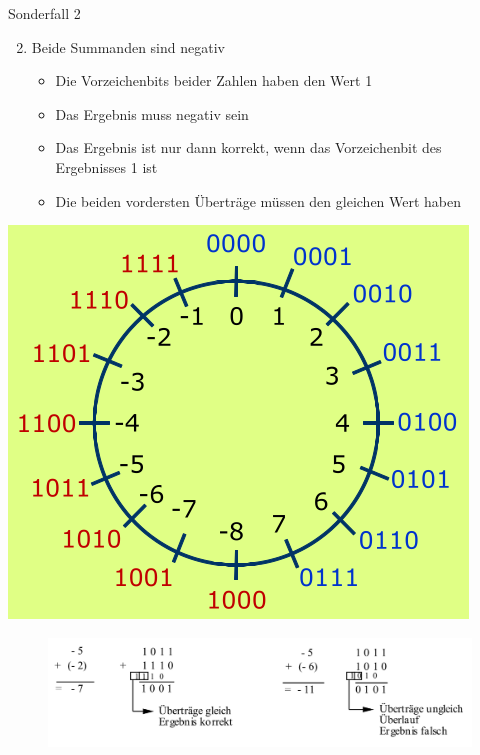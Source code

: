 \documentclass[12pt%
,xcolor=table
,aspectratio=169%
]{beamer}
\begin{document}
\begin{frame}{Sonderfall 2}
	\begin{enumerate} \setcounter{enumi}{1}
		\item Beide Summanden sind negativ
		\begin{itemize}
			\item Die Vorzeichenbits beider Zahlen haben den Wert 1
			\item Das Ergebnis muss negativ sein
			\item Das Ergebnis ist nur dann korrekt, wenn das Vorzeichenbit des Ergebnisses 1 ist
			\item Die beiden vordersten Überträge müssen den gleichen Wert haben
		\end{itemize}
	\end{enumerate}
\endminipage\hfill
{}%
  \includegraphics[scale=0.3]{pictures/sub3}
\endminipage
\begin{figure}
\includegraphics[scale=0.27]{pictures/sub4}
\end{figure}
\end{frame}
\end{document}
